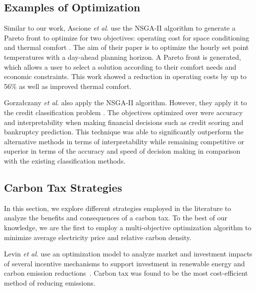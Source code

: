 \subsection{Examples of Optimization}

Similar to our work, Ascione  \textit{et al}. use the NSGA-II algorithm to generate a Pareto front to optimize for two objectives: operating cost for space conditioning and thermal comfort \cite{Ascione2016}. The aim of their paper is to optimize the hourly set point temperatures with a day-ahead planning horizon. A Pareto front is generated, which allows a user to select a solution according to their comfort needs and economic constraints. This work showed a reduction in operating costs by up to 56\% as well as improved thermal comfort.

Gorza\l{}czany \textit{et al}. also apply the NSGA-II algorithm. However, they apply it to the credit classification problem \cite{Gorzaczany2016}. The objectives optimized over were accuracy and interpretability when making financial decisions such as credit scoring and bankruptcy prediction. This technique was able to significantly outperform the alternative methods in terms of interpretability while remaining competitive or superior in terms of the accuracy and speed of decision making in comparison with the existing classification methods.



\subsection{Carbon Tax Strategies}

In this section, we explore different strategies employed in the literature to analyze the benefits and consequences of a carbon tax. To the best of our knowledge, we are the first to employ a multi-objective optimization algorithm to minimize average electricity price and relative carbon density.

Levin \textit{et al}. use an optimization model to analyze market and investment impacts of several incentive mechanisms to support investment in renewable energy and carbon emission reductions~\cite{Levin2019}. Carbon tax was found to be the most cost-efficient method of reducing emissions.

